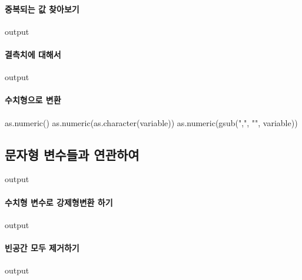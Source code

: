 \documentclass{report}
\begin{document}
\paragraph{중복되는 값 찾아보기}
\begin{Schunk}
\begin{Soutput}
output
\end{Soutput}
\end{Schunk}

\paragraph{결측치에 대해서}
\begin{Schunk}
\begin{Soutput}
output
\end{Soutput}
\end{Schunk}

\paragraph{수치형으로 변환}

\begin{Schunk}
\begin{Soutput}
as.numeric()
as.numeric(as.character(variable))
as.numeric(gsub(",", "", variable))
\end{Soutput}
\end{Schunk}



\subsection{문자형 변수들과 연관하여}

\begin{Schunk}
\begin{Soutput}
output
\end{Soutput}
\end{Schunk}

\paragraph{수치형 변수로 강제형변환 하기}
\begin{Schunk}
\begin{Soutput}
output
\end{Soutput}
\end{Schunk}

\paragraph{빈공간 모두 제거하기}
\begin{Schunk}
\begin{Soutput}
output
\end{Soutput}
\end{Schunk}
\end{document}
